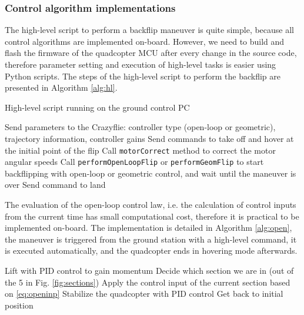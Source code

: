 \subsubsection{Control algorithm implementations}

The high-level script to perform a backflip maneuver is quite simple, because all control algorithms are implemented on-board. However, we need to build and flash the firmware of the quadcopter MCU after every change in the source code, therefore parameter setting and execution of high-level tasks is easier using Python scripts. The steps of the high-level script to perform the backflip are presented in Algorithm \ref{alg:hl}.
\begin{algorithm}
  \caption{High-level script running on the ground control PC}
  \label{alg:hl}
  \begin{algorithmic}[1]
    \State Send parameters to the Crazyflie: controller type (open-loop or geometric), trajectory information, controller gains
    \State Send commands to take off and hover at the initial point of the flip
    \State Call \verb+motorCorrect+ method to correct the motor angular speeds
    \State Call \verb+performOpenLoopFlip+ or \verb+performGeomFlip+ to start backflipping with open-loop or geometric control, and wait until the maneuver is over
    \State Send command to land
  \end{algorithmic}
  \end{algorithm}

The evaluation of the open-loop control law, i.e. the calculation of control inputs from the current time has small computational cost, therefore it is practical to be implemented on-board. The implementation is detailed in Algorithm \ref{alg:open}, the maneuver is triggered from the ground station with a high-level command, it is executed automatically, and the quadcopter ends in hovering mode afterwards.
\begin{algorithm}
  \cprotect\caption{\verb+performOpenLoopFlip+ on-board implementation}
  \label{alg:open}
  \begin{algorithmic}[1]
    \State Lift with PID control to gain momentum
      \State Decide which section we are in (out of the 5 in Fig. \ref{fig:sections})
      \State Apply the control input of the current section based on \eqref{eq:openinp}
    \EndWhile
    \State Stabilize the quadcopter with PID control
    \State Get back to initial position
  \end{algorithmic}
  \end{algorithm}
  
